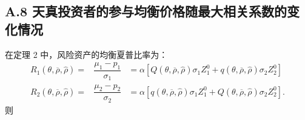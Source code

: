 \documentclass[10.0pt]{article}
\begin{document}
\subsection*{A.8 \quad 天真投资者的参与均衡价格随最大相关系数的变化情况}

\quad

在定理 2 中，风险资产的均衡夏普比率为：
{\footnotesize \begin{eqnarray*}
R_1 (\theta, \overline{\rho}, {\hat \rho}) = & \dfrac{\mu_1 - p_1}{\sigma_1} & = \alpha \left[ Q (\theta, \overline{\rho}, {\hat \rho}) \sigma_1 Z_1^0 + q (\theta, \overline{\rho}, {\hat \rho}) \sigma_2 Z_2^0 \right] \\
R_2 (\theta, \overline{\rho}, {\hat \rho}) = & \dfrac{\mu_2 - p_2}{\sigma_2} & = \alpha \left[ q (\theta, \overline{\rho}, {\hat \rho}) \sigma_1 Z_1^0 + Q (\theta, \overline{\rho}, {\hat \rho}) \sigma_2 Z_2^0 \right].
\end{eqnarray*}}
则
\end{document}

